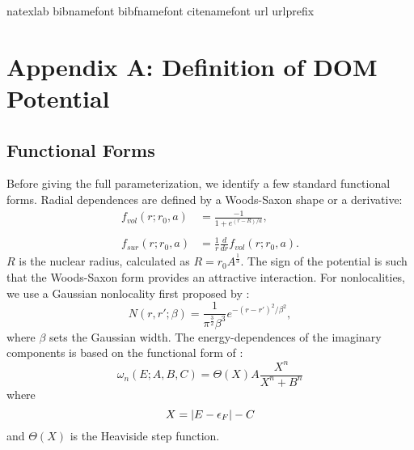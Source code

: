 \documentclass[twocolumn,secnumarabic,amssymb, nobibnotes, aps, prl,
superscriptaddress, nobalancelastpage, floatfix]{revtex4}
\begin{document}
{
\begin{thebibliography}{32} \expandafter\ifx\csname
        natexlab\endcsname\relax\def\natexlab#1{#1}\fi \expandafter\ifx\csname
        bibnamefont\endcsname\relax \def\bibnamefont#1{#1}\fi
        \expandafter\ifx\csname bibfnamefont\endcsname\relax
        \def\bibfnamefont#1{#1}\fi \expandafter\ifx\csname
        citenamefont\endcsname\relax \def\citenamefont#1{#1}\fi
        \expandafter\ifx\csname url\endcsname\relax \def\url#1{\texttt{#1}}\fi
        \expandafter\ifx\csname urlprefix\endcsname\relax\def\urlprefix{URL
        }\fi \providecommand{\bibinfo}[2]{#2}
        \providecommand{\eprint}[2][]{\url{#2}}
\end{thebibliography}

\clearpage
\appendix \label{DOMFunctionalForms}
\section{Appendix A: Definition of DOM Potential}
\subsection{Functional Forms}
Before giving the full parameterization, we identify a few standard functional
forms. Radial dependences are defined by a Woods-Saxon shape or a derivative:
\begin{equation} \label{WoodsSaxon}
    \begin{split}
        f_{vol}(r; r_{0}, a) & = \frac{-1}{1+e^{(r-R)/a}},\\
        \\
        f_{sur}(r; r_{0}, a) & = \frac{1}{r}\frac{d}{dr}f_{vol}(r; r_{0}, a).
    \end{split}
\end{equation}
$R$ is the nuclear radius, calculated as $R = r_{0}A^{\frac{1}{3}}$.
The sign of the potential is such that the Woods-Saxon form
provides an attractive interaction. For nonlocalities, we use a Gaussian
nonlocality first proposed by \cite{Perey1962}:
\begin{equation}
    N(r, r';\beta) = \frac{1}{\pi^{\frac{3}{2}}\beta^{3}}
    e^{-(r-r')^{2}/{\beta^{2}}},
\end{equation}
where $\beta$ sets the Gaussian width.
The energy-dependences of the imaginary components is based on the functional form of \cite{Charity2006}:
\begin{equation} \label{omega}
    \omega_{n}(E; A, B, C) = \Theta(X)A\frac{X^{n}}{X^{n}+B^{n}}
\end{equation}
where
\begin{equation*}
    X = |E-\epsilon_{F}|-C\\
\end{equation*}
and $\Theta(X)$ is the Heaviside step function. 

}
\end{document}
